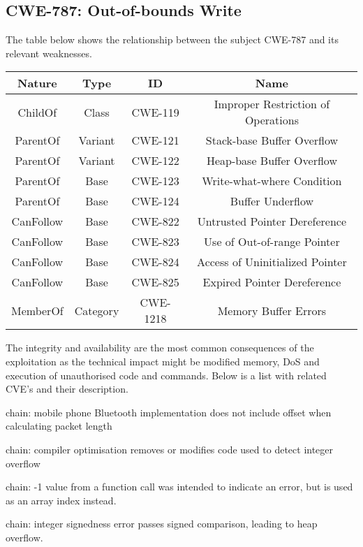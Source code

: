 \subsection{CWE-787: Out-of-bounds Write}
\label{sec:lab4-cwe787}
The table below shows the relationship between the subject CWE-787 and its
relevant weaknesses.

\begin{table}[H]
  \begin{center}
    \label{tab:lab4-table2}
    \begin{tabular}{c c c c}
      \toprule
      \textbf{Nature} & \textbf{Type} & \textbf{ID} & \textbf{Name} \\
      \midrule
      ChildOf & Class & CWE-119 & Improper Restriction of Operations\\
      ParentOf & Variant & CWE-121 & Stack-base Buffer Overflow\\
      ParentOf & Variant & CWE-122 & Heap-base Buffer Overflow\\
      ParentOf & Base & CWE-123 & Write-what-where Condition\\
      ParentOf & Base & CWE-124 & Buffer Underflow\\
      CanFollow & Base & CWE-822 & Untrusted Pointer Dereference\\
      CanFollow & Base & CWE-823 & Use of Out-of-range Pointer\\
      CanFollow & Base & CWE-824 & Access of Uninitialized Pointer\\
      CanFollow & Base & CWE-825 & Expired Pointer Dereference\\
      MemberOf & Category & CWE-1218 & Memory Buffer Errors\\
      \bottomrule
    \end{tabular}
  \end{center}
\end{table}

The integrity and availability are the most common consequences of the
exploitation as the technical impact might be modified memory, DoS and execution
of unauthorised code and commands. Below is a list with related CVE's and their
description.

\begin{description}[align=left]
  \item [CVE-2020-0022] chain: mobile phone Bluetooth implementation does not
  include offset when calculating packet length
  \item [CVE-2009-1010] chain: compiler optimisation removes or modifies code
  used to detect integer overflow
  \item [CVE-2009-0269] chain: -1 value from a function call was intended to
  indicate an error, but is used as an array index instead.
  \item [CVE-2002-4268] chain: integer signedness error passes signed
  comparison, leading to heap overflow.
\end{description}


